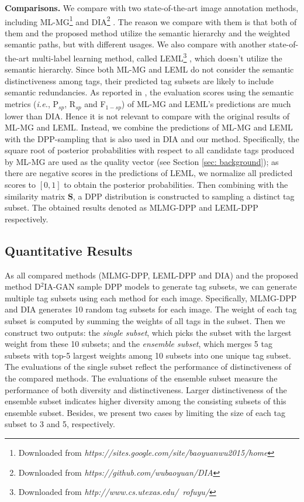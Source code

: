 \documentclass[10pt,twocolumn,letterpaper]{article}
\begin{document}
\vspace{3pt}
\noindent
{\bf Comparisons.} 
We compare with two state-of-the-art image annotation methods, including ML-MG\footnote{Downloaded from {\it https://sites.google.com/site/baoyuanwu2015/home}} \cite{my-iccv-2015} and DIA\footnote{Downloaded from {\it https://github.com/wubaoyuan/DIA}} \cite{my-cvpr-2017-dia}. 
The reason we compare with them is that both of them and the proposed method utilize the semantic hierarchy and the weighted semantic paths, but with different usages. 
We also compare with another state-of-the-art multi-label learning method, called LEML\footnote{Downloaded from {\it http://www.cs.utexas.edu/~rofuyu/}} \cite{LEML-ICML-2014}, which doesn't utilize the semantic hierarchy.
Since both ML-MG and LEML do not consider the semantic distinctiveness among tags, their predicted tag subsets are likely to include semantic redundancies. As reported in \cite{my-cvpr-2017-dia}, the evaluation scores using the semantic metrics ({\it i.e.}, P$_{sp}$, R$_{sp}$ and F$_{1-sp}$) of ML-MG and LEML's predictions are much lower than DIA. Hence it is not relevant to compare with the original results of ML-MG and LEML. Instead, we combine the predictions of ML-MG and LEML with the DPP-sampling that is also used in DIA and our method. Specifically, the square root of posterior probabilities with respect to all candidate tags produced by ML-MG are used as the quality vector (see Section \ref{sec: background}); as there are negative scores in the predictions of LEML, we normalize all predicted scores to $[0,1]$ to obtain the posterior probabilities. Then combining with the similarity matrix $\mathbf{S}$, a DPP distribution is constructed to sampling a distinct tag subset. The obtained results denoted as MLMG-DPP and LEML-DPP respectively. 


\subsection{Quantitative Results}
\label{sec: subsec experimental results}

As all compared methods (MLMG-DPP, LEML-DPP and DIA) and the proposed method D$^2$IA-GAN sample DPP models to generate tag subsets, we can generate multiple tag subsets using each method for each image. 
Specifically, MLMG-DPP and DIA generates 10 random tag subsets for each image. The weight of each tag subset is computed by summing the weights of all tags in the subset. 
Then we construct two outputs: the {\it single subset}, which picks the subset with the largest weight from these 10 subsets; and the {\it ensemble subset}, which merges 5 tag subsets with top-5 largest weights among 10 subsets into one unique tag subset. 
The evaluations of the single subset reflect the performance of distinctiveness of the compared methods. 
The evaluations of the ensemble subset measure the performance of both diversity and distinctiveness. Larger distinctiveness of the ensemble subset indicates higher diversity among the consisting subsets of this ensemble subset. Besides, we present two cases by limiting the size of each tag subset to 3 and 5, respectively. 
\end{document}
